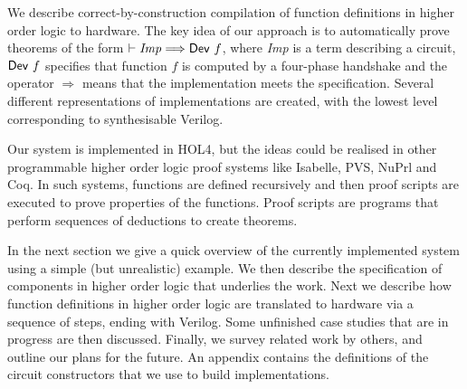 

We describe correct-by-construction compilation of
function definitions in higher order logic to hardware.  
The key idea of our approach is to automatically prove theorems of the
form $\vdash {\it{Imp}}\Longrightarrow\mathsf{Dev}~f$, where
{\it{Imp}} is a term describing a circuit, $\mathsf{Dev}~f$ specifies
that function $f$ is computed by a four-phase handshake and the
operator $\Longrightarrow$ means that the implementation meets the
specification.  Several different representations of implementations
are created, with the lowest level corresponding to
synthesisable Verilog.


Our system is implemented in HOL4, but the ideas could be
realised in other programmable higher order logic proof systems like
Isabelle, PVS, NuPrl and Coq. In such systems, functions are defined
recursively and then proof scripts are executed to prove properties of
the functions.  Proof scripts are programs that perform sequences of
deductions to create theorems.

In the next section we give a quick overview of the currently
implemented system using a simple (but unrealistic) example. We then
describe the specification of components in higher order logic that
underlies the work. Next we describe how function definitions in
higher order logic are translated to hardware via a sequence of steps,
ending with Verilog.  Some unfinished case studies that are in
progress are then discussed. Finally, we survey related work by
others, and outline our plans for the future. An appendix contains the
definitions of the circuit constructors that we use to build
implementations.

